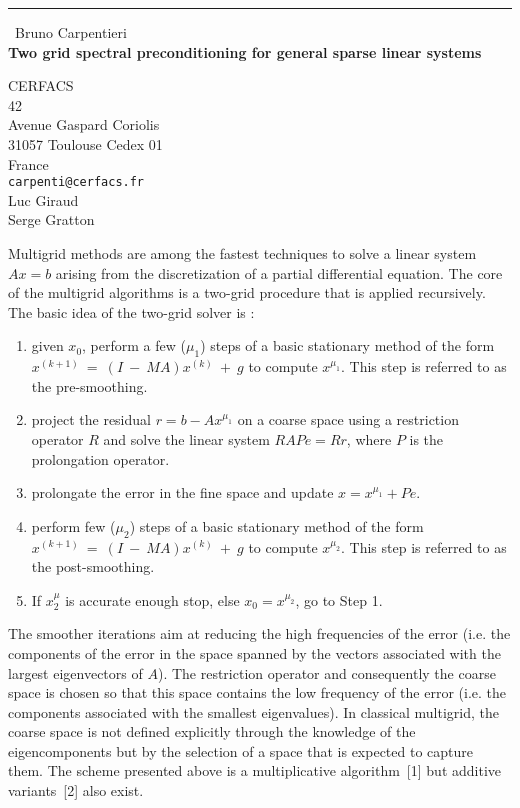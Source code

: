 \documentclass{report}
\begin{document}
\begin{center}
\rule{6in}{1pt} \
{\large Bruno Carpentieri \\
{\bf Two grid spectral preconditioning for general sparse linear systems}}

CERFACS \\ 42 \\ Avenue Gaspard Coriolis \\ 31057 Toulouse Cedex 01 \\ France
\\
{\tt carpenti@cerfacs.fr}\\
Luc Giraud\\
Serge Gratton\end{center}


Multigrid methods are among the fastest techniques to solve a linear
system $Ax = b$ arising from the
discretization of a partial differential equation.
The core of the multigrid algorithms is a two-grid procedure that is applied recursively.
The basic idea of the two-grid solver is :
\begin{enumerate}
\item given $x_0$, perform a few ($\mu_1$) steps of a basic stationary method of
the form $x^{(k+1)}~=~(I~-~MA)x^{(k)}~+~g $ to compute $x^{\mu_1}$.
This step is referred to as the pre-smoothing.
\item project the residual $r = b- Ax^{\mu_1}$ on a coarse space using a
restriction operator $R$ and solve
the linear system $RAP e = R r$, where $P$ is the prolongation operator.
\item prolongate the error in the fine space and update $x = x^{\mu_1} + P e$.
\item perform few ($\mu_2$) steps of a basic stationary method of
the form $x^{(k+1)}~=~(I~-~MA)x^{(k)}~+~g $ to compute $x^{\mu_2}$.
This step is referred to as the post-smoothing.
\item If $x^\mu_2$ is accurate enough stop, else $x_0 = x^{\mu_2}$, go to Step 1.
\end{enumerate}
The smoother iterations aim at reducing the high frequencies of
the error (i.e. the components of the error in the space spanned by the
vectors associated
with the largest eigenvectors of $A$).
The restriction operator and consequently the coarse space is chosen so
that this space contains the
low frequency of the error (i.e. the components associated with the
smallest eigenvalues).
In classical multigrid, the coarse space is not defined explicitly
through the knowledge of the
eigencomponents but by the selection of a space that is expected to capture them.
The scheme presented above is a multiplicative algorithm~[1] but additive
variants~[2] also exist.
\end{document}
